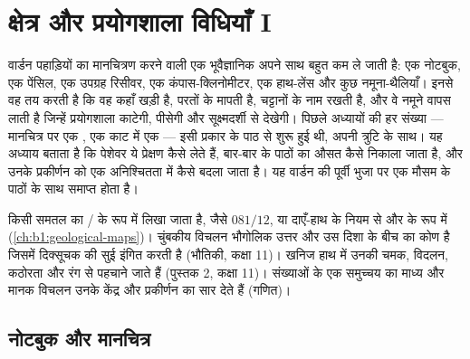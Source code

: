 \chapter{क्षेत्र और प्रयोगशाला विधियाँ I}\label{ch:b1:field-lab-methods-1}

वार्डन पहाड़ियों का मानचित्रण करने वाली एक भूवैज्ञानिक अपने साथ बहुत कम ले जाती है: एक नोटबुक, एक पेंसिल, एक
उपग्रह रिसीवर, एक कंपास-क्लिनोमीटर, एक हाथ-लेंस और कुछ नमूना-थैलियाँ। इनसे वह तय करती है कि वह कहाँ खड़ी है,
परतों के  मापती है, चट्टानों के नाम रखती है, और वे नमूने वापस लाती है जिन्हें प्रयोगशाला काटेगी, पीसेगी और
सूक्ष्मदर्शी से देखेगी। पिछले अध्यायों की हर संख्या --- मानचित्र पर एक , एक काट में एक  ---
इसी प्रकार के पाठ से शुरू हुई थी, अपनी त्रुटि के साथ। यह अध्याय बताता है कि पेशेवर ये प्रेक्षण कैसे लेते हैं,
बार-बार के पाठों का औसत कैसे निकाला जाता है, और उनके प्रकीर्णन को एक अनिश्चितता में कैसे बदला जाता है। यह
वार्डन  की पूर्वी भुजा पर एक मौसम के पाठों के साथ समाप्त होता है।

\begin{recall}
किसी समतल का  / के रूप में लिखा जाता है, जैसे $081/12$, या दाएँ-हाथ के नियम से 
और  के रूप में (\cref{ch:b1:geological-maps})। चुंबकीय विचलन भौगोलिक उत्तर और उस दिशा के बीच का कोण है जिसमें
दिक्सूचक की सुई इंगित करती है (भौतिकी, कक्षा 11)। खनिज हाथ में उनकी चमक, विदलन, कठोरता और रंग से पहचाने
जाते हैं (पुस्तक 2, कक्षा 11)। संख्याओं के एक समुच्चय का माध्य और मानक विचलन उनके केंद्र और प्रकीर्णन का सार
देते हैं (गणित)।
\end{recall}

\section{नोटबुक और मानचित्र}

